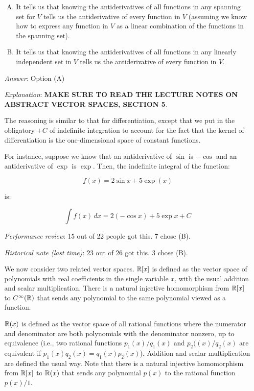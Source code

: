 \documentclass[10pt]{amsart}
\begin{document}
\begin{enumerate}
  \begin{enumerate}[(A)]
  \item It tells us that knowing the antiderivatives of all functions
    in any spanning set for $V$ tells us the antiderivative of every
    function in $V$ (assuming we know how to express any function in
    $V$ as a linear combination of the functions in the spanning set).
  \item It tells us that knowing the antiderivatives of all functions in
    any linearly independent set in $V$ tells us the antiderivative of every
    function in $V$.
  \end{enumerate}

  {\em Answer}: Option (A)

  {\em Explanation}: {\bf MAKE SURE TO READ THE LECTURE NOTES ON
    ABSTRACT VECTOR SPACES, SECTION 5}.

  The reasoning is similar to that for differentiation, except that we
  put in the obligatory $+C$ of indefinite integration to account for
  the fact that the kernel of differentiation is the one-dimensional
  space of constant functions.

  For instance, suppose we know that an antiderivative of $\sin$ is
  $-\cos$ and an antiderivative of $\exp$ is $\exp$. Then, the indefinite integral of the function:

  $$f(x) = 2\sin x + 5 \exp(x)$$

  is:

  $$\int f(x) \, dx = 2(-\cos x) + 5\exp x + C$$

  {\em Performance review}: 15 out of 22 people got this. 7 chose (B).

  {\em Historical note (last time)}: $23$ out of $26$ got this. $3$ chose (B).

  \vspace{0.6in}

  We now consider two related vector spaces. $\mathbb{R}[x]$ is defined as the
  vector space of polynomials with real coefficients in the single
  variable $x$, with the usual addition and scalar
  multiplication. There is a natural injective homomorphism from
  $\mathbb{R}[x]$ to $C^\infty(\mathbb{R})$ that sends any polynomial to the same
  polynomial viewed as a function.

  $\mathbb{R}(x)$ is defined as the vector space of all rational functions
  where the numerator and denominator are both polynomials with the
  denominator nonzero, up to equivalence (i.e., two rational functions
  $p_1(x)/q_1(x)$ and $p_2((x)/q_2(x)$ are equivalent if $p_1(x)q_2(x)
  = q_1(x)p_2(x)$). Addition and scalar multiplication are defined the
  usual way. Note that there is a natural injective homomorphism from
  $\mathbb{R}[x]$ to $\mathbb{R}(x)$ that sends any polynomial $p(x)$ to the rational
  function $p(x)/1$.


\end{enumerate}
\end{document}
